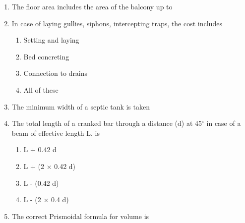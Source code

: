 \documentclass[11pt,a4paper]{article}
\begin{document}
\begin{enumerate}
{}
\\
\item{The floor area includes the area of the balcony up to}
\\
\item{In case of laying gullies, siphons, intercepting traps, the cost includes}
\begin{enumerate}[label=\Alph*.]
\item{Setting and laying}
\item{Bed concreting}
\item{Connection to drains}
\item{All of these}
\end{enumerate}
\item{The minimum width of a septic tank is taken}
\\\begin{enumerate*}[itemjoin=\qquad, label=\Alph*.]
\item{70 cm}
\item{75 cm}
\item{80 cm}
\item{90 cm}
\end{enumerate*}
\item{The total length of a cranked bar through a distance (d) at 45$^\circ$ in case of a beam of effective length L, is
}
\begin{enumerate}[label=\Alph*.]
\item{L + 0.42 d}
\item{L + (2 $\times$ 0.42 d)}
\item{L - (0.42 d)}
\item{L - (2 $\times$ 0.4 d)}
\end{enumerate}
\item{The correct Prismoidal formula for volume is}
\\\begin{enumerate*}[itemjoin=\qquad, label=\Alph*.]

\end{enumerate*}
\end{enumerate}
\end{document}
